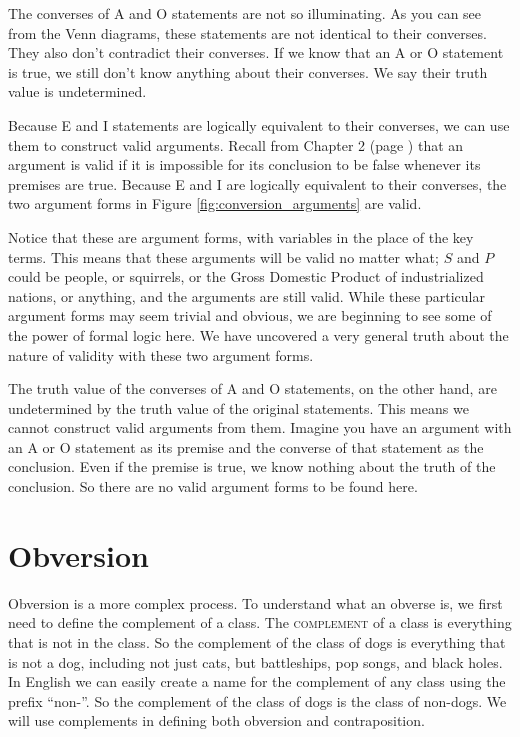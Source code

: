 The converses of A and O statements are not so illuminating. As you can see from the Venn diagrams, these statements are not identical to their converses. They also don't contradict their converses. If we know that an A or O statement is true, we still don't know anything about their converses. We say their truth value is undetermined.

Because E and I statements are logically equivalent to their converses, we can use them to construct valid arguments. Recall from Chapter 2 (page \pageref{def:valid}) that an argument is valid if it is impossible for its conclusion to be false whenever its premises are true. Because E and I are logically equivalent to their converses, the two argument forms in Figure \ref{fig:conversion_arguments} are valid.


\begin{kormanize}
\end{kormanize}


\begin{kormanize}
\end{kormanize}

Notice that these are argument forms, with variables in the place of the key terms. This means that these arguments will be valid no matter what; $S$ and $P$ could be people, or squirrels, or the Gross Domestic Product of industrialized nations, or anything, and the arguments are still valid. While these particular argument forms may seem trivial and obvious, we are beginning to see some of the power of formal logic here. We have uncovered a very general truth about the nature of validity with these two argument forms.

The truth value of the converses of A and O statements, on the other hand, are undetermined by the truth value of the original statements. This means we cannot construct valid arguments from them. Imagine you have an argument with an A or O statement as its premise and the converse of that statement as the conclusion. Even if the premise is true, we know nothing about the truth of the conclusion. So there are no valid argument forms to be found here.

\section{Obversion}\label{sec:obversion}


Obversion is a more complex process. To understand what an obverse is, we first need to define the complement of a class. The \textsc{\gls{complement}} \label{def:complement} of a class is everything that is not in the class. So the complement of the class of dogs is everything that is not a dog, including not just cats, but battleships, pop songs, and black holes. In English we can easily create a name for the complement of any class using the prefix ``non-''. So the complement of the class of dogs is the class of non-dogs. We will use complements in defining both obversion and contraposition.


